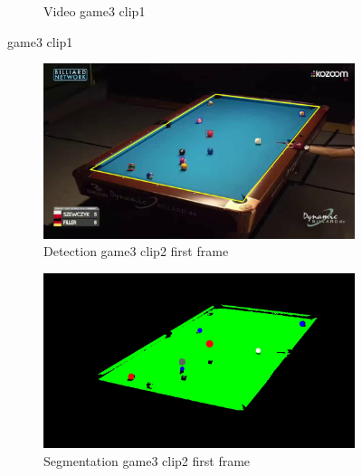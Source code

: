 \begin{figure}[H]
\begin{subfigure}[b]{0.48\textwidth}
    	\caption{Video game3 clip1}
    	\label{fig: game3_clip1_video}
    \end{subfigure}
    
	\caption{game3 clip1}
\end{figure}

\begin{figure}[H]
    \centering
    \begin{subfigure}[b]{0.48\textwidth}
        \centering
        \includegraphics[width=\textwidth]{images/Detection/game3_clip2_detected_balls_first_frame.jpg}
        \caption{Detection game3 clip2 first frame}
        \label{fig: game3_clip2_first_frame_detected}
    \end{subfigure}
    \begin{subfigure}[b]{0.48\textwidth}
        \centering
        \includegraphics[width=\textwidth]{images/Segmentation/game3_clip2_segmented_balls_first_frame.jpg}
        \caption{Segmentation game3 clip2 first frame}
		\label{fig: game3_clip2_first_frame_segmented}
    \end{subfigure}
    \begin{subfigure}[b]{0.48\textwidth}

\end{subfigure}
\end{figure}
